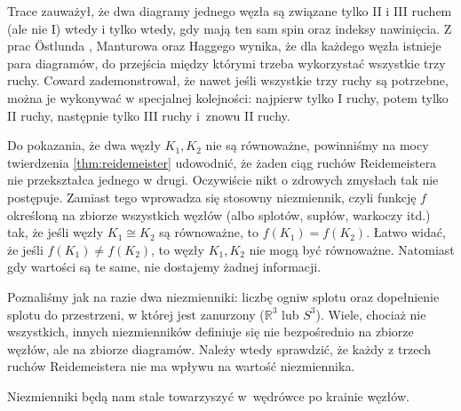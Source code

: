 Trace \cite{trace1983} zauważył, że dwa diagramy jednego węzła są związane tylko II i III ruchem (ale nie I) wtedy i tylko wtedy, gdy mają ten sam spin oraz indeksy nawinięcia.
%
%
%
Z prac Östlunda \cite{ostlund2001}, Manturowa \cite[s. ???]{manturov2004} oraz Haggego \cite{hagge2006} wynika, że dla każdego węzła istnieje para diagramów, do przejścia między którymi trzeba wykorzystać wszystkie trzy ruchy.
%
%
%
Coward \cite{coward2006} zademonstrował, że nawet jeśli wszystkie trzy ruchy są potrzebne, można je wykonywać w specjalnej kolejności: najpierw tylko I ruchy, potem tylko II ruchy, następnie tylko III ruchy i~znowu II ruchy.
%

Do pokazania, że dwa węzły $K_1, K_2$ nie są równoważne, powinniśmy na mocy twierdzenia \ref{thm:reidemeister} udowodnić, że żaden ciąg ruchów Reidemeistera nie przekształca jednego w drugi.
\label{page_first_invariant}%
Oczywiście nikt o zdrowych zmysłach tak nie postępuje.
Zamiast tego wprowadza się stosowny niezmiennik, czyli funkcję $f$ określoną na zbiorze wszystkich węzłów (albo splotów, supłów, warkoczy itd.) tak, że jeśli węzły $K_1 \cong K_2$ są równoważne, to $f(K_1) = f(K_2)$.
Łatwo widać, że jeśli $f(K_1) \neq f(K_2)$, to węzły $K_1, K_2$ nie mogą być równoważne.
Natomiast gdy wartości są te same, nie dostajemy żadnej informacji.

Poznaliśmy jak na razie dwa niezmienniki: liczbę ogniw splotu oraz dopełnienie splotu do przestrzeni, w której jest zanurzony ($\mathbb R^3$ lub $S^3$).
Wiele, chociaż nie wszystkich, innych niezmienników definiuje się nie bezpośrednio na zbiorze węzłów, ale na zbiorze diagramów.
Należy wtedy sprawdzić, że każdy z trzech ruchów Reidemeistera nie ma wpływu na wartość niezmiennika.

Niezmienniki będą nam stale towarzyszyć w~wędrówce po krainie węzłów.

